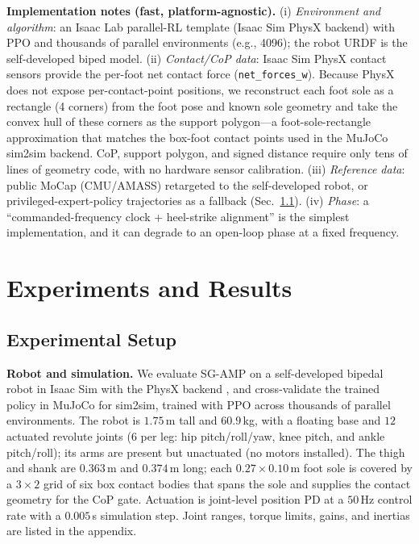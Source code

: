 \documentclass[conference]{IEEEtran}
\begin{document}
\noindent\textbf{Implementation notes (fast, platform-agnostic).}
(i) \emph{Environment and algorithm}: an Isaac Lab parallel-RL template (Isaac Sim PhysX backend) with PPO and thousands of parallel environments (e.g., 4096); the robot URDF is the self-developed biped model. (ii) \emph{Contact/CoP data}: Isaac Sim PhysX contact sensors provide the per-foot net contact force (\texttt{net\_forces\_w}). Because PhysX does not expose per-contact-point positions, we reconstruct each foot sole as a rectangle (4 corners) from the foot pose and known sole geometry and take the convex hull of these corners as the support polygon---a foot-sole-rectangle approximation that matches the box-foot contact points used in the MuJoCo sim2sim backend. CoP, support polygon, and signed distance require only tens of lines of geometry code, with no hardware sensor calibration. (iii) \emph{Reference data}: public MoCap (CMU/AMASS) retargeted to the self-developed robot, or privileged-expert-policy trajectories as a fallback (Sec.~\ref{subsec:setup}). (iv) \emph{Phase}: a ``commanded-frequency clock + heel-strike alignment'' is the simplest implementation, and it can degrade to an open-loop phase at a fixed frequency.

\section{Experiments and Results}
\label{sec:experiments}

\subsection{Experimental Setup}
\label{subsec:setup}

\textbf{Robot and simulation.} We evaluate SG-AMP on a self-developed bipedal robot in Isaac Sim with the PhysX backend \cite{mittal2023isaaclab}, and cross-validate the trained policy in MuJoCo \cite{todorov2012mujoco} for sim2sim, trained with PPO across thousands of parallel environments. The robot is $1.75$\,m tall and $60.9$\,kg, with a floating base and $12$ actuated revolute joints ($6$ per leg: hip pitch/roll/yaw, knee pitch, and ankle pitch/roll); its arms are present but unactuated (no motors installed). The thigh and shank are $0.363$\,m and $0.374$\,m long; each $0.27\times0.10$\,m foot sole is covered by a $3\times2$ grid of six box contact bodies that spans the sole and supplies the contact geometry for the CoP gate. Actuation is joint-level position PD at a $50$\,Hz control rate with a $0.005$\,s simulation step. Joint ranges, torque limits, gains, and inertias are listed in the appendix.
\end{document}
